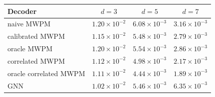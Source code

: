 \begin{tabular}{lccc}
\toprule
Decoder & $d=3$ & $d=5$ & $d=7$ \\
\midrule
naive MWPM & $1.20\times10^{-2}$ & $6.08\times10^{-3}$ & $3.16\times10^{-3}$ \\
calibrated MWPM & $1.15\times10^{-2}$ & $5.48\times10^{-3}$ & $2.79\times10^{-3}$ \\
oracle MWPM & $1.20\times10^{-2}$ & $5.54\times10^{-3}$ & $2.86\times10^{-3}$ \\
correlated MWPM & $1.12\times10^{-2}$ & $4.98\times10^{-3}$ & $2.17\times10^{-3}$ \\
oracle correlated MWPM & $1.11\times10^{-2}$ & $4.44\times10^{-3}$ & $1.89\times10^{-3}$ \\
GNN & $1.02\times10^{-2}$ & $5.46\times10^{-3}$ & $6.35\times10^{-3}$ \\
\bottomrule
\end{tabular}
